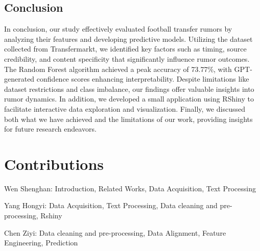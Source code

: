 \subsection{Conclusion}
In conclusion, our study effectively evaluated football transfer rumors by analyzing their features and developing predictive models. Utilizing the dataset collected from Transfermarkt, we identified key factors such as timing, source credibility, and content specificity that significantly influence rumor outcomes. The Random Forest algorithm achieved a peak accuracy of 73.77\%, with GPT-generated confidence scores enhancing interpretability. Despite limitations like dataset restrictions and class imbalance, our findings offer valuable insights into rumor dynamics. In addition, we developed a small application using RShiny to facilitate interactive data exploration and visualization. Finally, we discussed both what we have achieved and the limitations of our work, providing insights for future research endeavors.

\section{Contributions}
Wen Shenghan: Introduction, Related Works, Data Acquisition, Text Processing

Yang Hongyi:  Data Acquisition, Text Processing, Data cleaning and pre-processing, Rshiny

Chen Ziyi:  Data cleaning and pre-processing, Data Alignment, Feature Engineering, Prediction